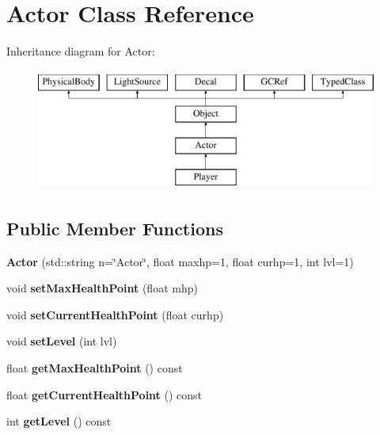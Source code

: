 \hypertarget{classActor}{}\section{Actor Class Reference}
\label{classActor}
Inheritance diagram for Actor\+:\begin{figure}[H]
\begin{center}
\leavevmode
\includegraphics[height=4.000000cm]{classActor}
\end{center}
\end{figure}
\subsection*{Public Member Functions}
\begin{DoxyCompactItemize}
\item 
\hypertarget{classActor_aaa8c3a626ddda737270006259be1bfbe}{}{\bfseries Actor} (std\+::string n=\char`\"{}Actor\char`\"{}, float maxhp=1, float curhp=1, int lvl=1)\label{classActor_aaa8c3a626ddda737270006259be1bfbe}

\item 
\hypertarget{classActor_a162b1257ffca028edd0d4db0077cf671}{}void {\bfseries set\+Max\+Health\+Point} (float mhp)\label{classActor_a162b1257ffca028edd0d4db0077cf671}

\item 
\hypertarget{classActor_a12e31ce9c3517bd08640d7cc6b1748d8}{}void {\bfseries set\+Current\+Health\+Point} (float curhp)\label{classActor_a12e31ce9c3517bd08640d7cc6b1748d8}

\item 
\hypertarget{classActor_a771a4d2caa4cb8332b18f8bd6f786245}{}void {\bfseries set\+Level} (int lvl)\label{classActor_a771a4d2caa4cb8332b18f8bd6f786245}

\item 
\hypertarget{classActor_ab8df0b5c89a00f84095977cdb34029c7}{}float {\bfseries get\+Max\+Health\+Point} () const \label{classActor_ab8df0b5c89a00f84095977cdb34029c7}

\item 
\hypertarget{classActor_a09fbcbbca7b72174ba9fb5af36c3d9f2}{}float {\bfseries get\+Current\+Health\+Point} () const \label{classActor_a09fbcbbca7b72174ba9fb5af36c3d9f2}

\item 
\hypertarget{classActor_ae42874679e670febffa8919497a4fddd}{}int {\bfseries get\+Level} () const \label{classActor_ae42874679e670febffa8919497a4fddd}

\end{DoxyCompactItemize}
